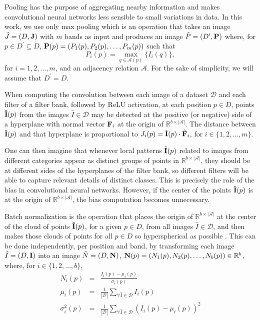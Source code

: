 \documentclass[10pt,twocolumn,letterpaper]{article}
\newcommand{\R}{\mathbb{R}}
\newcommand{\A}{\mathcal{A}}
\newcommand{\D}{\mathcal{D}}
\newcommand{\I}{\hat{I}}
\newcommand{\m}[1]{{\mathrm{\bf #1}}}
\newcommand{\E}{\tilde{\m{I}}}
\newcommand{\lI}{\m{I}}
\newcommand{\mF}{\m{F}}
\newcommand{\J}{\hat{J}}
\newcommand{\lJ}{\m{J}}
\newcommand{\pD}{D^\prime}
\newcommand{\eF}{\hat{\mF}}
\begin{document}
Pooling has the purpose of aggregating nearby information and makes convolutional neural networks less sensible to small variations in data. In this work, we use only max pooling which is an operation that takes an image $\J = (D, \lJ)$ with $m$ bands as input and produces an image $\hat{P} = (\pD, \m{P})$ where, for $p \in \pD\subseteq D$, ${\m{P}} (p) = (P_1(p), P_2(p), \ldots, P_m(p))$ such that \[P_i(p) = \max_{q \in \A(p)}\{I_i(q)\},\] for $i = 1, 2, \ldots, m$, and an adjacency relation $\A$. For the sake of simplicity, we will assume that $\pD=D$.

When computing the convolution between each image of a dataset $\D$ and each filter of a filter bank, followed by ReLU activation,
at each position $p\in D$, points $\E(p)$ from the
images $\I \in \D$ may be detected at the positive (or
negative) side of a hyperplane with normal vector $\mF_i$ at the origin of $\R^{b \times |\A|}$. The distance
between $\E(p)$ and that hyperplane is proportional to $J_i(p)
=\E(p) \cdot \eF_i$, for $i \in
\{1,2,\ldots,m\}$.

One can then imagine that whenever local patterns $\E(p)$ related to images from different categories appear as
distinct groups of points in $\R^{b\times |\A|}$, they should
be at different sides of the hyperplanes of the filter bank, so
different filters will be able to capture relevant details of distinct
classes. This is precisely the role of the bias in convolutional
neural networks. However, if the center of the points $\E(p)$ is at the origin of $\R^{b\times |\A|}$, the bias
computation becomes unnecessary.

Batch normalization is the operation that places the origin of
$\R^{b\times |\A|}$ at the center of the cloud of points
$\E(p)$, for a given $p\in D$, from all images $\hat{I}\in
\D$, and then makes those clouds of points for all $p\in D$ so
hyperspherical as possible \cite{ioffe2015batch}. This can be done independently, per
position and band, by transforming each image $\I=(D,\lI)$
into an image $\hat{N}=(D,{\bf N})$, ${\bf
  N}(p)=(N_1(p),N_2(p),\ldots,N_b(p))\in \R^b$, where, for $i\in \{1,2,\ldots,b\}$,
\begin{eqnarray}
  N_i(p) & = & \frac{I_i(p) - \mu_i(p)}{\sigma_i(p)} \\
  \mu_i(p) & = & \frac{1}{|\D|} \sum_{\forall \hat{I}\in \D} I_{i}(p) \\
  \sigma^2_i(p) & = & \frac{1}{|\D|} \sum_{\forall \hat{I}\in \D} \left(I_{i}(p)-\mu_i(p)\right)^2
\end{eqnarray}
\end{document}
